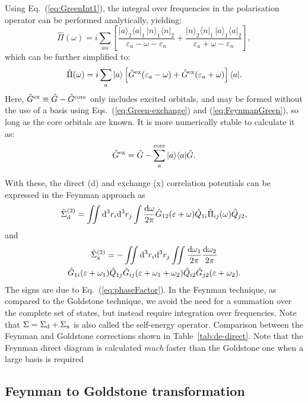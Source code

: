 \documentclass[10pt,twocolumn,a4paper]{article}%
\newcommand{\bra}[1]{\ensuremath{\langle #1|}}	%
\newcommand{\ket}[1]{\ensuremath{|#1\rangle}}
\newcommand{\be}{\begin{equation}}
\newcommand{\ee}{\end{equation}}
\def\d{\ensuremath{{\rm d}}}
\def\en{\ensuremath{\varepsilon}}
\newcommand{\w}{\ensuremath{\omega}}
\begin{document}
Using Eq.~(\ref{eq:GreenInt1}), the integral over frequencies in the polarisation operator can be performed analytically, yielding:
\be\label{eq:PiGreen2}
\hat\Pi(\w) = i\sum_{an}\left[
\frac{\ket{a}_2\bra{a}_1 \, \ket{n}_1\bra{n}_2}{\en_a-\w-\en_n}
+
\frac{\ket{n}_2\bra{n}_1 \, \ket{a}_1\bra{a}_2}{\en_a+\w-\en_n}
\right],
\ee
which can be further simplified to:
\be\label{eq:PiGreen}
\hat\Pi(\w) = i\sum_a \ket{a}\left[\hat G^{\rm ex}(\en_a -\w) +  \hat G^{\rm ex}(\en_a +\w)\right]\bra{a}.
\ee
Here, $\hat G^{\rm ex}\equiv\hat G-\hat G^{\rm core}$ only includes excited orbitals, and may be formed without the use of a basis using Eqs.~(\ref{eq:Green-exchange}) and (\ref{eq:FeynmanGreen}), so long as the core orbitals are known.
It is more numerically stable to calculate it as:
\be\label{eq:Gex}
\hat G^{\rm ex} =  \hat G - \sum_a^{\rm core} \ket{a}\bra{a}\hat G.
\ee


With these, the direct (d) and exchange (x) correlation potentials can be expressed in the Feynman approach as
\be\label{eq:FeynDir}
\hat\Sigma^{(2)}_{\rm d}
= \iint\d^3 r_i\d^3 r_j
\int\frac{\d\w}{2\pi}\hat G_{12}(\en+\w)\hat Q_{1i}\hat\Pi_{ij}(\w)\hat Q_{j2},
\ee
and
\begin{multline}\label{eq:FeynExch}
\hat\Sigma^{(2)}_{\rm x}
= -\iint\d^3 r_i\d^3 r_j
\iint\frac{\d\w_1}{2\pi}\frac{\d\w_2}{2\pi}\\
\hat G_{1i}(\en+\w_1)\hat Q_{1j} \hat G_{ij}(\en+\w_1+\w_2)\hat Q_{i2}\hat G_{j2}(\en+\w_2).
\end{multline}
The signs are due to Eq.~(\ref{eq:phaseFactor}).
In the Feynman technique, as compared to the Goldstone technique, we avoid the need for a summation over the complete set of states, but instead require integration over frequencies.
Note that $\Sigma = \Sigma_{\rm d} + \Sigma_{\rm x}$ is also called the self-energy operator.
Comparison between the Feynman and Goldstone corrections shown in Table~\ref{tab:de-direct}.
Note that the Feynman direct diagram is calculated {\em much} faster than the Goldstone one when a large basis is required




\subsection{Feynman to Goldstone transformation}
\end{document}
